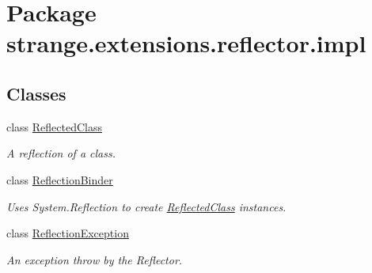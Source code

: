\hypertarget{namespacestrange_1_1extensions_1_1reflector_1_1impl}{\section{Package strange.\-extensions.\-reflector.\-impl}
\label{namespacestrange_1_1extensions_1_1reflector_1_1impl}
}
\subsection*{Classes}
\begin{DoxyCompactItemize}
\item 
class \hyperlink{classstrange_1_1extensions_1_1reflector_1_1impl_1_1_reflected_class}{Reflected\-Class}
\begin{DoxyCompactList}\small\item\em A reflection of a class. \end{DoxyCompactList}\item 
class \hyperlink{classstrange_1_1extensions_1_1reflector_1_1impl_1_1_reflection_binder}{Reflection\-Binder}
\begin{DoxyCompactList}\small\item\em Uses System.\-Reflection to create {\ttfamily \hyperlink{classstrange_1_1extensions_1_1reflector_1_1impl_1_1_reflected_class}{Reflected\-Class}} instances. \end{DoxyCompactList}\item 
class \hyperlink{classstrange_1_1extensions_1_1reflector_1_1impl_1_1_reflection_exception}{Reflection\-Exception}
\begin{DoxyCompactList}\small\item\em An exception throw by the Reflector. \end{DoxyCompactList}\end{DoxyCompactItemize}
